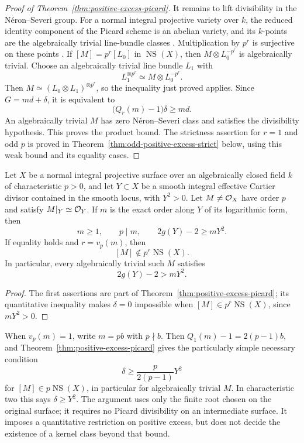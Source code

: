 \begin{proof}[Proof of Theorem~\ref{thm:positive-excess-picard}]
It remains to lift divisibility in the N\'eron--Severi group.
For a normal integral projective variety over $k$, the reduced
identity component of the Picard scheme is an abelian variety,
and its $k$-points are the algebraically trivial line-bundle classes
\cite[Theorems~2.5 and~5.4, Proposition~5.10 and
Remark~5.25, pp.~18--20, 37--38, 41--42 and~51]{KleimanPicard}.
Multiplication by $p^r$ is surjective on these points
\cite[Tag~03RP, parts~(3)--(4)]{Stacks}.
If $[M]=p^r[L_0]$ in $\operatorname{NS}(X)$, then
$M\otimes L_0^{-p^r}$ is algebraically trivial. Choose an
algebraically trivial line bundle $L_1$ with
\[
 L_1^{\otimes p^r}\simeq M\otimes L_0^{-p^r}.
\]
Then $M\simeq(L_0\otimes L_1)^{\otimes p^r}$, so the inequality
just proved applies. Since $G=md+\delta$, it is equivalent to
\[
 \bigl(Q_r(m)-1\bigr)\delta\geq md.
\]
An algebraically trivial $M$ has zero N\'eron--Severi class and
satisfies the divisibility hypothesis. This proves the product bound.
The strictness assertion for $r=1$ and odd $p$ is proved in
Theorem~\ref{thm:odd-positive-excess-strict} below, using this weak
bound and its equality cases.
\end{proof}

\begin{corollary}\label{thm:positive-square-picard}
Let $X$ be a normal integral projective surface over an algebraically
closed field $k$ of characteristic $p>0$, and let $Y\subset X$ be a
smooth integral effective Cartier divisor contained in the smooth
locus, with $Y^2>0$. Let $M\ne\mathcal O_X$ have order $p$ and satisfy
$M|_Y\simeq\mathcal O_Y$. If $m$ is the exact order along $Y$ of its
logarithmic form, then
\[
 m\geq1,\qquad p\mid m,\qquad 2g(Y)-2\geq mY^2.
\]
If equality holds and $r=v_p(m)$, then
\[
 [M]\notin p^r\operatorname{NS}(X).
\]
In particular, every algebraically trivial such $M$ satisfies
\[
 2g(Y)-2>mY^2.
\]
\end{corollary}

\begin{proof}
The first assertions are part of
Theorem~\ref{thm:positive-excess-picard}; its quantitative inequality
makes $\delta=0$ impossible when
$[M]\in p^r\operatorname{NS}(X)$, since $mY^2>0$.
\end{proof}

When $v_p(m)=1$, write $m=pb$ with $p\nmid b$.
Then $Q_1(m)-1=2(p-1)b$, and
Theorem~\ref{thm:positive-excess-picard} gives the particularly simple
necessary condition
\begin{equation}\label{eq:positive-square-first-valuation}
 \delta\geq\frac{p}{2(p-1)}Y^2
\end{equation}
for $[M]\in p\operatorname{NS}(X)$, in particular for algebraically
trivial $M$. In characteristic two this says $\delta\geq Y^2$.
The argument uses only the finite root chosen on the original
surface; it requires no Picard divisibility on an intermediate
surface. It imposes a quantitative restriction on positive excess,
but does not decide the existence of a kernel class beyond that
bound.

